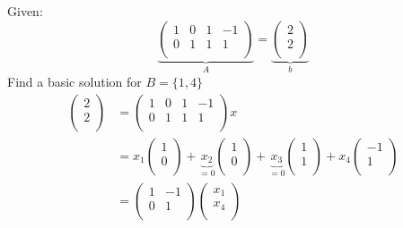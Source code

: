 \documentclass[letterpaper, 12pt]{article}
\begin{document}
    \bigskip
    Given:\\
    $$\underbrace{\begin{pmatrix}
        1 & 0 & 1 & -1\\
        0 & 1 & 1 & 1\\
    \end{pmatrix}}_{A} = \underbrace{\begin{pmatrix}
        2\\2\\
    \end{pmatrix}}_{b}$$
    Find a basic solution for $B = \{1, 4\}$\\
    \begin{align*}
        \begin{pmatrix}
            2\\2\\
        \end{pmatrix} &= \begin{pmatrix}
            1 & 0 & 1 & -1\\
            0 & 1 & 1 & 1\\
        \end{pmatrix}x\\
        &= x_1\begin{pmatrix}
            1\\0\\
        \end{pmatrix} + \underbrace{x_2}_{=0}\begin{pmatrix}
            1\\0\\
        \end{pmatrix} + \underbrace{x_3}_{=0}\begin{pmatrix}
            1\\1\\
        \end{pmatrix} + x_4\begin{pmatrix}
            -1\\1\\
        \end{pmatrix}\\
        &= \begin{pmatrix}
            1 & -1\\
            0 & 1\\
        \end{pmatrix}\begin{pmatrix}
            x_1\\x_4\\

\end{pmatrix}
\end{align*}
\end{document}
